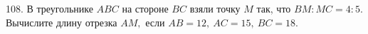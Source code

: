 108. В треугольнике $ABC$ на стороне $BC$ взяли точку $M$ так, что $BM:MC=4:5.$ Вычислите длину отрезка $AM,$ если $AB=12,\ AC=15,\ BC=18.$\\
